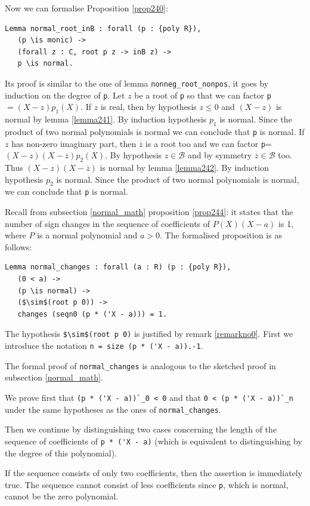 \documentclass[11pt, a4paper]{article}
\newcommand{\ol}{\overline}
\newcommand{\ssb}{{\mathcal B}}
\begin{document}
Now we can formalise Proposition \ref{prop240}:
\begin{lstlisting}
Lemma normal_root_inB : forall (p : {poly R}),
   (p \is monic) ->
   (forall z : C, root p z -> inB z) -> 
   p \is normal.
\end{lstlisting}
Its proof is similar to the one of lemma \lstinline!nonneg_root_nonpos!, it goes by induction on the degree of \lstinline!p!. Let $z$ be a root of \lstinline!p! so that we can factor \lstinline!p!$=(X-z)p_1(X)$. If $z$ is real, then by hypothesis $z \leq 0$ and $(X-z)$ is normal by lemma \ref{lemma241}. By induction hypothesis $p_1$ is normal. Since the product of two normal polynomials is normal we can conclude that \lstinline!p! is normal. If $z$ has non-zero imaginary part, then $\ol{z}$ is a root too and we can factor \lstinline!p!=$(X-z)(X-\ol{z})p_2(X)$. By hypothesis $z \in \ssb$ and by symmetry $\ol{z} \in \ssb$ too. Thus $(X-z)(X-\ol{z})$ is normal by lemma \ref{lemma242}. By induction hypothesis $p_2$ is normal. Since the product of two normal polynomials is normal, we can conclude that \lstinline!p! is normal.

Recall from subsection \ref{normal_math} proposition \ref{prop244}: it states that the number of sign changes in the sequence of coefficients of $P(X)(X-a)$ is 1, where $P$ is a normal polynomial and $a >0$. The formalised proposition is as follows:
\begin{lstlisting}
Lemma normal_changes : forall (a : R) (p : {poly R}),
   (0 < a) ->
   (p \is normal) ->
   ($\sim$(root p 0)) ->
   changes (seqn0 (p * ('X - a))) = 1.
\end{lstlisting}
The hypothesis \lstinline!$\sim$(root p 0)! is justified by remark \ref{remarkno0}.
First we introduce the notation \lstinline!n = size (p * ('X - a)).-1!. 

The formal proof of \lstinline!normal_changes! is analogous to the sketched proof in subsection \ref{normal_math}.

We prove first that \lstinline!(p * ('X - a))`_0 < 0! and  that \lstinline!0 < (p * ('X - a))`_n! under the same hypotheses as the ones of \lstinline!normal_changes!.

Then we continue by distinguishing two cases concerning the length of the  sequence of coefficients of \lstinline!p * ('X - a)! (which is equivalent to distinguishing by the degree of this polynomial).

If the sequence consists of only two coefficients, then the assertion is immediately true. The sequence cannot consist of less coefficients since \lstinline!p!, which is normal, cannot be the zero polynomial. 
\end{document}
